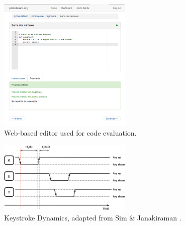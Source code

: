 \documentclass[conference]{IEEEtran}
\begin{document}
\begin{figure}[!t] 
\centering 
\includegraphics[width=2.5in]{editorRresult.png} 
\caption{Web-based editor used for code evaluation.}
\label{fig_editor} 
\end{figure}
\begin{figure}[b!] 
\centering 
\includegraphics[width=2.5in]{KeyDyn.png} 
\caption{Keystroke Dynamics, adapted from Sim \& Janakiraman \cite{sim2007digraphs}.}
\label{fig_KD} 
\end{figure}
\end{document}
